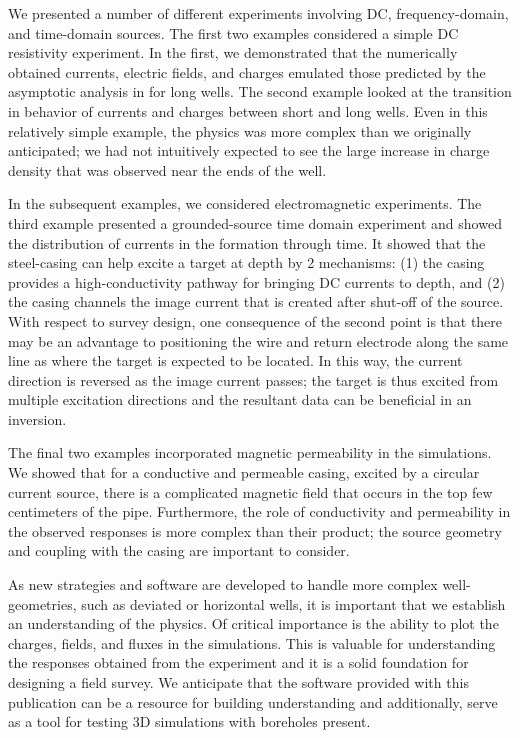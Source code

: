 \documentclass[preprint,review,3p,times,onecolumn,authoryear]{elsarticle}
\begin{document}
We presented a number of different experiments involving DC, frequency-domain, and time-domain sources. The first two examples considered a simple DC resistivity experiment. In the first, we demonstrated that the numerically obtained currents, electric fields, and charges emulated those predicted by the asymptotic analysis in \cite{Kaufman1990} for long wells. The second example looked at the transition in behavior of currents and charges between short and long wells. Even in this relatively simple example, the physics was more complex than we originally anticipated; we had not intuitively expected to see the large increase in charge density that was observed near the ends of the well.

In the subsequent examples, we considered electromagnetic experiments. The third example presented a grounded-source time domain experiment and showed the distribution of currents in the formation through time. It showed that the steel-casing can help excite a target at depth by 2 mechanisms: (1) the casing provides a high-conductivity pathway for bringing DC currents to depth, and (2) the casing channels the image current that is created after shut-off of the source. With respect to survey design, one consequence of the second point is that there may be an advantage to positioning the wire and return electrode along the same line as where the target is expected to be located. In this way, the current direction is reversed as the image current passes; the target is thus excited from  multiple excitation directions and the resultant data can be beneficial in an inversion.

The final two examples incorporated magnetic permeability in the simulations. We showed that for a conductive and permeable casing, excited by a circular current source, there is a complicated magnetic field that occurs in the top few centimeters of the pipe. Furthermore, the role of conductivity and permeability in the observed responses is more complex than their product; the source geometry and coupling with the casing are important to consider.

As new strategies and software are developed to handle more complex well-geometries, such as deviated or horizontal wells, it is important that we establish an understanding of the physics. Of critical importance is the ability to plot the charges, fields, and fluxes in the simulations. This is valuable for understanding the responses obtained from the experiment and it is a solid foundation for designing a field survey. We anticipate that the software provided with this publication can be a resource for building understanding and additionally, serve as a tool for testing 3D simulations with boreholes present.
\end{document}
